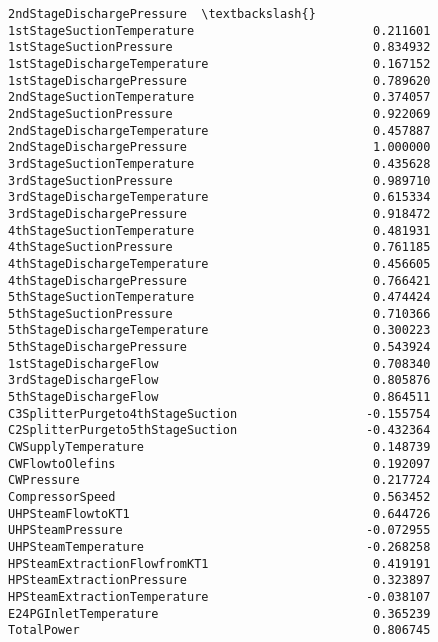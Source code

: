 \documentclass[11pt]{article}
\begin{document}
\begin{tcolorbox}[breakable, size=fbox, boxrule=.5pt, pad at break*=1mm, opacityfill=0]
\begin{Verbatim}[commandchars=\\\{\}]
                                  2ndStageDischargePressure  \textbackslash{}
1stStageSuctionTemperature                         0.211601
1stStageSuctionPressure                            0.834932
1stStageDischargeTemperature                       0.167152
1stStageDischargePressure                          0.789620
2ndStageSuctionTemperature                         0.374057
2ndStageSuctionPressure                            0.922069
2ndStageDischargeTemperature                       0.457887
2ndStageDischargePressure                          1.000000
3rdStageSuctionTemperature                         0.435628
3rdStageSuctionPressure                            0.989710
3rdStageDischargeTemperature                       0.615334
3rdStageDischargePressure                          0.918472
4thStageSuctionTemperature                         0.481931
4thStageSuctionPressure                            0.761185
4thStageDischargeTemperature                       0.456605
4thStageDischargePressure                          0.766421
5thStageSuctionTemperature                         0.474424
5thStageSuctionPressure                            0.710366
5thStageDischargeTemperature                       0.300223
5thStageDischargePressure                          0.543924
1stStageDischargeFlow                              0.708340
3rdStageDischargeFlow                              0.805876
5thStageDischargeFlow                              0.864511
C3SplitterPurgeto4thStageSuction                  -0.155754
C2SplitterPurgeto5thStageSuction                  -0.432364
CWSupplyTemperature                                0.148739
CWFlowtoOlefins                                    0.192097
CWPressure                                         0.217724
CompressorSpeed                                    0.563452
UHPSteamFlowtoKT1                                  0.644726
UHPSteamPressure                                  -0.072955
UHPSteamTemperature                               -0.268258
HPSteamExtractionFlowfromKT1                       0.419191
HPSteamExtractionPressure                          0.323897
HPSteamExtractionTemperature                      -0.038107
E24PGInletTemperature                              0.365239
TotalPower                                         0.806745


\end{Verbatim}
\end{tcolorbox}
\end{document}
